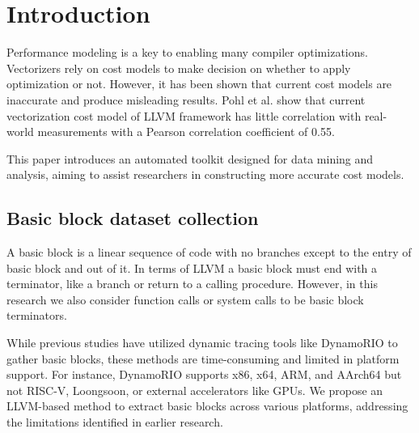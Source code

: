 \section{Introduction}
Performance modeling is a key to enabling many compiler optimizations. Vectorizers rely on cost models to 
make decision on whether to apply optimization or not. However, it has been shown that current cost models
are inaccurate and produce misleading results. Pohl et al. \cite{pohlPortableCostModeling2019} show that
current vectorization cost model of LLVM framework has little correlation with real-world measurements 
with a Pearson correlation coefficient of 0.55.

This paper introduces an automated toolkit designed for data mining and analysis, aiming to assist 
researchers in constructing more accurate cost models.

\subsection{Basic block dataset collection}

A basic block is a linear sequence of code with no branches except to the entry of basic block and out 
of it. In terms of LLVM a basic block must end with a terminator, like a branch or return to a calling 
procedure. However, in this research we also consider function calls or system calls to be basic block 
terminators.

While previous studies have utilized dynamic tracing tools like DynamoRIO \cite{chenBHiveBenchmarkSuite2019} 
to gather basic blocks, these methods are time-consuming and limited in platform support. For instance, 
DynamoRIO supports x86, x64, ARM, and AArch64 \cite{brueningInfrastructureAdaptiveDynamic2003} but not 
RISC-V, Loongsoon, or external accelerators like GPUs. We propose an LLVM-based method to extract basic 
blocks across various platforms, addressing the limitations identified in earlier research.

